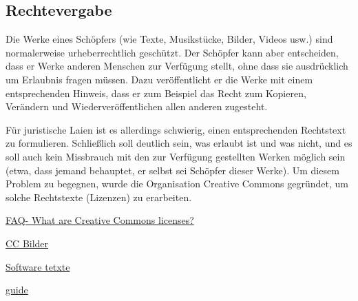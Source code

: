 \subsection{Rechtevergabe}
\label{sec:lizenzen}

Die Werke eines Schöpfers (wie Texte, Musikstücke, Bilder, Videos usw.) sind normalerweise urheberrechtlich geschützt. Der Schöpfer kann aber entscheiden, dass er Werke anderen Menschen zur Verfügung stellt, ohne dass sie ausdrücklich um Erlaubnis fragen müssen. Dazu veröffentlicht er die Werke mit einem entsprechenden Hinweis, dass er zum Beispiel das Recht zum Kopieren, Verändern und Wiederveröffentlichen allen anderen zugesteht.

Für juristische Laien ist es allerdings schwierig, einen entsprechenden Rechtstext zu formulieren. Schließlich soll deutlich sein, was erlaubt ist und was nicht, und es soll auch kein Missbrauch mit den zur Verfügung gestellten Werken möglich sein (etwa, dass jemand behauptet, er selbst sei Schöpfer dieser Werke). Um diesem Problem zu begegnen, wurde die Organisation Creative Commons gegründet, um solche Rechtstexte (Lizenzen) zu erarbeiten. \cite{wikicc}



\hyperlink{https://www.wur.nl/en/article/What-are-Creative-Commons-licenses.htm}{FAQ- What are Creative Commons licenses?}

\hyperlink{https://creativecommons.org/licenses/}{CC Bilder }

\hyperlink{https://moqod-software.medium.com/understanding-open-source-and-free-software-licensing-c0fa600106c9}{Software tetxte}

\hyperlink{https://choosealicense.com/}{guide}